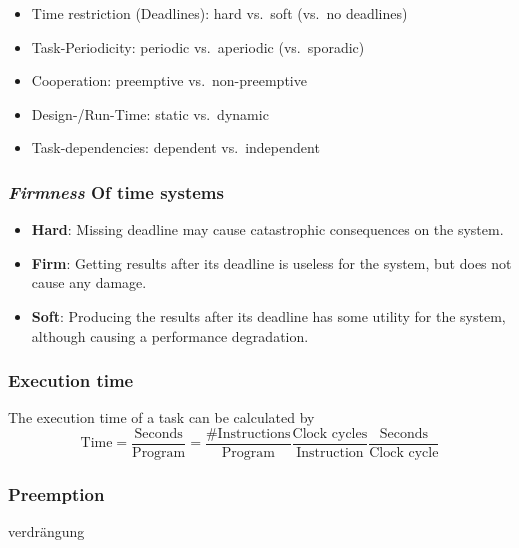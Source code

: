 \begin{itemize}
    \item Time restriction (Deadlines): hard vs.~soft (vs.~no deadlines)
    \item Task-Periodicity: periodic vs.~aperiodic (vs.~sporadic)
    \item Cooperation: preemptive vs.~non-preemptive
    \item Design-/Run-Time: static vs.~dynamic
    \item Task-dependencies: dependent vs.~independent
\end{itemize}


\vspace*{-0.5cm}

\subsubsection{\textit{Firmness} Of time systems}
\begin{itemize}
\item \textbf{Hard}: Missing deadline may cause catastrophic consequences on the system.
\item \textbf{Firm}: Getting results after its deadline is useless for the system, but does not cause any damage.
\item \textbf{Soft}: Producing the results after its deadline has some utility for the system, although causing a performance degradation.
\end{itemize}

\subsubsection{Execution time}
\label{sec:execution_time}
\vspace*{-0.1cm}
The execution time of a task can be calculated by
\vspace*{-0.2cm}
\begin{equation*}
    \boxed{\text{Time} = 
    \frac{\text{Seconds}}{\text{Program}} = 
    \frac{\#\text{Instructions}}{\text{Program}} \frac{\text{Clock cycles}}{\text{Instruction}} \frac{\text{Seconds}}{\text{Clock cycle}}}
\end{equation*}
\vspace*{-0.4cm}
\subsubsection{Preemption}{verdrängung}

